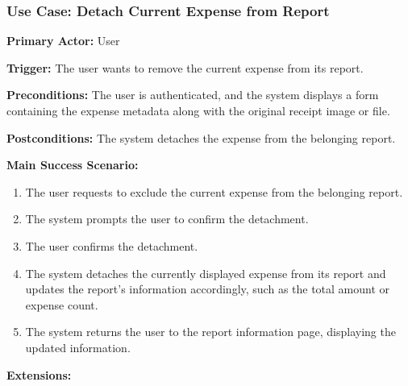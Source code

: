 \newpage

\subsubsection{\textbf{Use Case: Detach Current Expense from Report}}

\textbf{Primary Actor:} User

\textbf{Trigger:} The user wants to remove the current expense from its report.

\textbf{Preconditions:} The user is authenticated, and the system displays a form containing the expense metadata along with the original receipt image or file.

\textbf{Postconditions:} The system detaches the expense from the belonging report.

\vspace{0.5cm}

\textbf{Main Success Scenario:}

\begin{enumerate} [leftmargin=0.75cm, noitemsep]
\item The user requests to exclude the current expense from the belonging report.
\item The system prompts the user to confirm the detachment.
\item The user confirms the detachment.
\item The system detaches the currently displayed expense from its report and updates the report’s information accordingly, such as the total amount or expense count.
\item The system returns the user to the report information page, displaying the updated information.
\end{enumerate}

\vspace{0.3cm}

\textbf{Extensions:}

